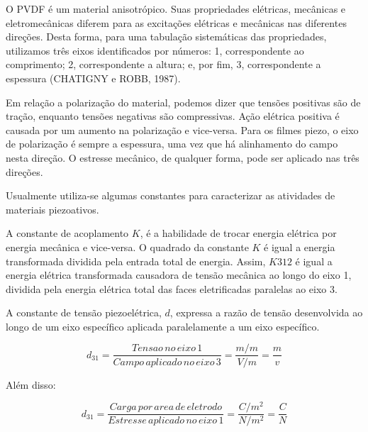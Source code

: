 \documentclass[
	12pt,				
	oneside,			
	a4paper,			
	english,			
	brazil,			
	]{abntex2ppgsi}
\begin{document}
O PVDF é um material anisotrópico.  Suas propriedades elétricas, mecânicas e eletromecânicas diferem para as excitações elétricas e mecânicas nas diferentes direções. Desta forma, para uma tabulação sistemáticas das propriedades, utilizamos três eixos identificados por números: 1, correspondente ao comprimento; 2, correspondente a altura; e, por fim, 3, correspondente a espessura (CHATIGNY e ROBB, 1987). 

Em relação a polarização do material, podemos dizer que tensões positivas são de tração, enquanto tensões negativas são compressivas. Ação elétrica positiva é causada por um aumento na polarização e vice-versa. Para os filmes piezo, o eixo de polarização é sempre a espessura, uma vez que há alinhamento do campo nesta direção. O estresse mecânico, de qualquer forma, pode ser aplicado nas três direções. 

Usualmente utiliza-se algumas constantes para caracterizar as atividades de materiais piezoativos. 

A constante de acoplamento $K$, é a habilidade de trocar energia elétrica por energia mecânica e vice-versa. O quadrado da constante $K$ é igual a energia transformada dividida pela entrada total de energia. Assim, $K312$ é igual a energia elétrica transformada causadora de tensão mecânica ao longo do eixo 1, dividida pela energia elétrica total das faces eletrificadas paralelas ao eixo 3. 

A constante de tensão piezoelétrica, $d$, expressa a razão de tensão desenvolvida ao longo de um eixo específico aplicada paralelamente a um eixo específico. 

\begin{equation}
	d_{31} = \frac{Tensao \,no \,eixo \,1}{Campo \,aplicado \,no \,eixo \,3} = \frac{m/m}{V/m} = \frac{m}{v}
	\label{eq: Constante de Tensão Piezoelétrica}
\end{equation}



Além disso:

\begin{equation}
	d_{31} = \frac{Carga \,por \,area \,de \,eletrodo}{Estresse \,aplicado \,no \,eixo \,1} = \frac{C/m^{2}}{N/m^{2}} = \frac{C}{N}
	\label{eq: Boa pergunta}
\end{equation}

\end{document}
